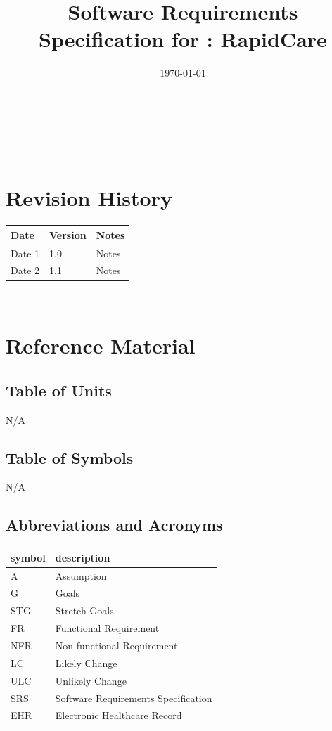 \documentclass[12pt]{article}
\begin{document}
\title{Software Requirements Specification for \progname: RapidCare}
\author{\authname}
\date{\today}
	
\maketitle

~\newpage


\tableofcontents

~\newpage

\section*{Revision History}

\begin{tabularx}{\textwidth}{p{3cm}p{2cm}X}
\toprule {\bf Date} & {\bf Version} & {\bf Notes}\\
\midrule
Date 1 & 1.0 & Notes\\
Date 2 & 1.1 & Notes\\
\bottomrule
\end{tabularx}

~\newpage

\section{Reference Material}

\subsection{Table of Units}
N/A

\subsection{Table of Symbols}
N/A

\subsection{Abbreviations and Acronyms}

\begin{tabular}{l l} 
  \toprule    
  \textbf{symbol} & \textbf{description}\\
  \midrule 
  A & Assumption\\
  G & Goals\\
  STG & Stretch Goals\\
  FR & Functional Requirement\\
  NFR & Non-functional Requirement\\
  LC & Likely Change\\
  ULC & Unlikely Change\\
  SRS & Software Requirements Specification\\
  EHR & Electronic Healthcare Record\\
  \bottomrule
\end{tabular}\\
\end{document}
